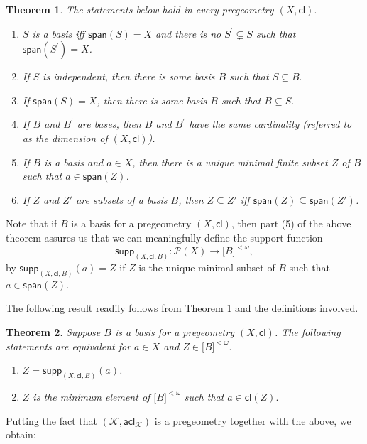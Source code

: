 \documentclass{amsart}
\newtheorem{theorem}{Theorem}[section]
\begin{document}
\begin{theorem}\label{basic_thm_pregeometry}The statements below hold in every pregeometry $(X,\mathsf{cl}).$

\begin{enumerate}[$1$.]
\item  $S$ is a basis iff $\mathsf{span}(S)=X$ and there is no 
$S^{\prime}\subsetneq S$ such that $\mathsf{span}(S^{\prime})=X$.
%
\item  If $S$ is independent, then there is some basis $B$ such that 
$S\subseteq B.$
%
\item  If $\mathsf{span}(S)=X$, then there is some basis $B$ such that $%
B\subseteq S.$
%
\item  If $B$ and $B^{\prime }$ are bases, then $B$ and $B^{\prime }$ have
the same cardinality \textup(referred to as the \textit{dimension} of $(X,\mathsf{cl})$\textup).
%
\item  If $B$ is a basis and $a\in X$, then there is a unique minimal finite subset $Z$ 
of $B$ such that $a\in \mathsf{span}(Z)$.
%
\item If $Z$ and $Z'$ are subsets of a basis $B$, then $%
Z\subseteq Z'$ iff $\mathsf{span}(Z)\subseteq \mathsf{span}%
(Z')$.
\end{enumerate}
%
\end{theorem}
Note that if $B$ is a basis for a pregeometry $(X,\mathsf{cl})$, then part (5) of the above theorem assures us that we can meaningfully define the support function $$\mathsf{supp}_{(X,%
\mathsf{cl},B)}:\mathcal{P}(X)\rightarrow \lbrack B]^{<\omega },$$ by $\mathsf{
supp}_{(X,
\mathsf{cl},B)}(a)=Z$ if $Z$ is the unique minimal subset of $B$ such that $a\in \mathsf{span}(Z)$. 

The following result readily follows from Theorem \ref{basic_thm_pregeometry} and the definitions involved.
\begin{theorem}\label{support_in-pregeometry}Suppose $B$ is a basis for a pregeometry $(X,\mathsf{cl})$. The
following statements are equivalent for $a\in X$ and $Z\in \lbrack
B]^{<\omega }.$
\begin{enumerate}[$1$.]
\item 
$Z=\mathsf{supp}_{(X,\mathsf{cl},B)}(a)$.
%
\item $Z$ is the minimum element of $\lbrack
B]^{<\omega }$ such that $a\in \mathsf{cl}(Z).$
\end{enumerate}
\end{theorem}
Putting the fact that $(\mathcal{K},\mathsf{acl}_{\mathcal{K}})$ is a pregeometry together with the above, we obtain:
\end{document}
